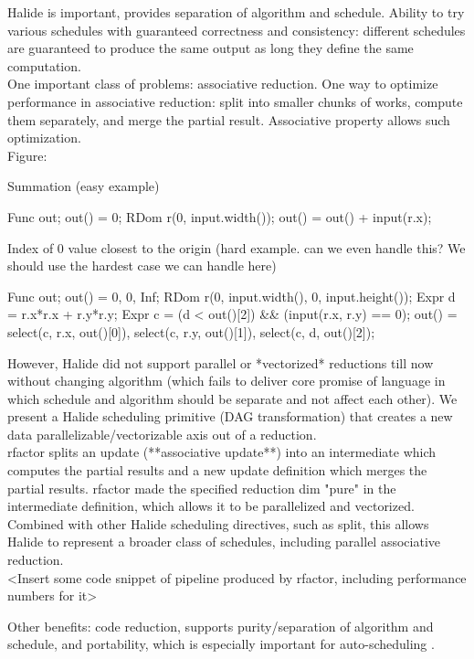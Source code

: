 Halide \cite{Ragan-Kelley:2013:HLC:2491956.2462176} is important, provides separation of algorithm and schedule. Ability to try various schedules with guaranteed correctness and consistency: different schedules are guaranteed to produce the same output as long they define the same computation. \\

One important class of problems: associative reduction. One way to optimize performance in associative reduction: split into smaller chunks of works, compute them separately, and merge the partial result. Associative property allows such optimization. \\

Figure:

Summation (easy example)

Func out;
out() = 0;
RDom r(0, input.width());
out() = out() + input(r.x);

Index of 0 value closest to the origin (hard example. can we even handle this? We should use the hardest case we can handle here)

Func out;
out() = {0, 0, Inf};
RDom r(0, input.width(), 0, input.height());
Expr d = r.x*r.x + r.y*r.y;
Expr c = (d < out()[2]) && (input(r.x, r.y) == 0);
out() = {select(c, r.x, out()[0]),
         select(c, r.y, out()[1]),
         select(c, d, out()[2])};


However, Halide did not support parallel or *vectorized* reductions till now without changing algorithm (which fails to deliver core promise of language in which schedule and algorithm should be separate and not affect each other). We present a Halide scheduling primitive (DAG transformation) that creates a new data parallelizable/vectorizable axis out of a reduction. \\

rfactor splits an update (**associative update**) into an intermediate which computes the partial results and a new update definition which merges the partial results. rfactor made the specified reduction dim "pure" in the intermediate definition, which allows it to be parallelized and vectorized. Combined with other Halide scheduling directives, such as split, this allows Halide to represent a broader class of schedules, including parallel associative reduction. \\

<Insert some code snippet of pipeline produced by rfactor, including performance numbers for it>

Other benefits: code reduction, supports purity/separation of algorithm and schedule, and portability, which is especially important for auto-scheduling \cite{Mullapudi:2016:ASH:2897824.2925952}. \\
